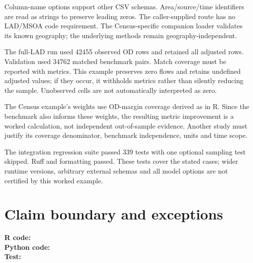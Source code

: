 \documentclass[10pt]{article}
\begin{document}
Column-name options support other CSV schemas. Area/source/time identifiers
are read as strings to preserve leading zeros. The caller-supplied route has
no LAD/MSOA code requirement. The Census-specific companion loader validates
its known geography; the underlying methods remain geography-independent.

The full-LAD run used 42455 observed OD rows and retained all adjusted rows.
Validation used 34762 matched benchmark pairs. Match coverage must be reported
with metrics. This example preserves zero flows and retains undefined adjusted
values; if they occur, it withholds metrics rather than silently reducing the
sample. Unobserved cells are not automatically interpreted as zero.

The Census example's weights use OD-margin coverage derived as in R. Since the
benchmark also informs these weights, the resulting metric improvement is a
worked calculation, not independent out-of-sample evidence. Another study must
justify its coverage denominator, benchmark independence, units and time scope.

The integration regression suite passed 339 tests with one optional sampling
test skipped. Ruff and formatting passed. These tests cover the stated cases;
wider runtime versions, arbitrary external schemas and all model options are
not certified by this worked example.


\section{Claim boundary and exceptions}
{\footnotesize \textbf{R code:} \\ \textbf{Python code:} \\ \textbf{Test:} \par}
\end{document}
